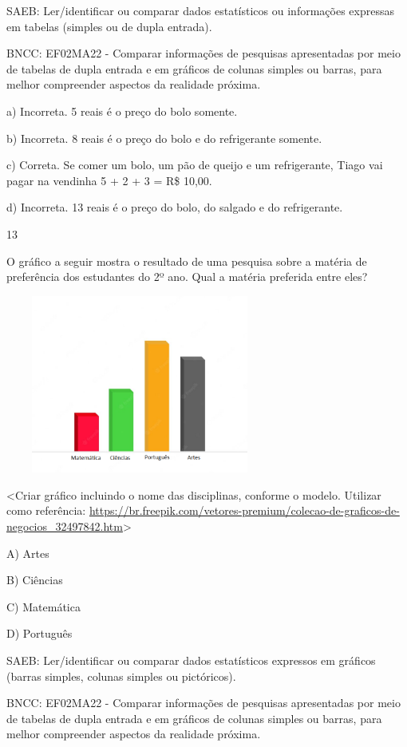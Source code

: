 \begin{escolha}
\begin{escolha}
{{{{SAEB: Ler/identificar ou comparar dados estatísticos ou
informações expressas em tabelas (simples ou de dupla entrada).

BNCC: EF02MA22 - Comparar informações de pesquisas apresentadas por meio
de tabelas de dupla entrada e em gráficos de colunas simples ou barras,
para melhor compreender aspectos da realidade próxima.

a) Incorreta. 5 reais é o preço do bolo somente.

b) Incorreta. 8 reais é o preço do bolo e do refrigerante somente.

c) Correta. Se comer um bolo, um pão de queijo e um refrigerante, Tiago
vai pagar na vendinha 5 + 2 + 3 = R\$ 10,00.

d) Incorreta. 13 reais é o preço do bolo, do salgado e do refrigerante.

\num{13}

O gráfico a seguir mostra o resultado de uma pesquisa sobre a matéria de
preferência dos estudantes do 2º ano. Qual a matéria preferida entre eles?

\includegraphics[width=3.48228in,height=2.30682in]{media/image160.png}

\textless{}Criar gráfico incluindo o nome das disciplinas, conforme o
modelo. Utilizar como referência:
\url{https://br.freepik.com/vetores-premium/colecao-de-graficos-de-negocios_32497842.htm}\textgreater{}

A) Artes

B) Ciências

C) Matemática

D) Português

SAEB: Ler/identificar ou comparar dados estatísticos expressos
em gráficos (barras simples, colunas simples ou pictóricos).

BNCC: EF02MA22 - Comparar informações de pesquisas apresentadas por meio
de tabelas de dupla entrada e em gráficos de colunas simples ou barras,
para melhor compreender aspectos da realidade próxima.

}}}}
\end{escolha}
\end{escolha}
